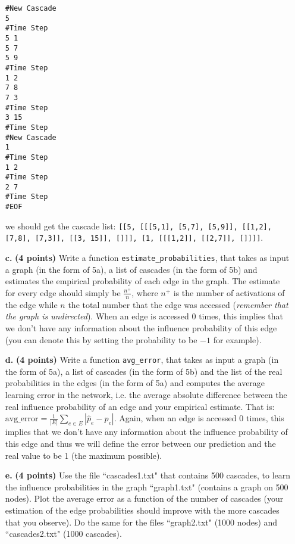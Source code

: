 \documentclass[11pt]{article}
\theoremstyle{definition} \newtheorem{Theorem}{theorem}
\begin{document}
\begin{itemize}
\noindent \texttt{\#New Cascade\\
5\\
\#Time Step\\
5 1\\
5 7\\
5 9\\
\#Time Step\\
1 2\\
7 8\\
7 3\\
\#Time Step\\
3 15\\
\#Time Step\\
\#New Cascade\\
1\\
\#Time Step\\
1 2\\
\#Time Step\\
2 7\\
\#Time Step\\
\#EOF
}

\noindent we should get the cascade list:  \texttt{[[5, [[[5,1], [5,7], [5,9]], [[1,2], [7,8], [7,3]], [[3, 15]], []]], [1, [[[1,2]], [[2,7]], []]]]}.

\item[\textbf{c. }] \textbf{(4 points)} Write a function \texttt{estimate\_probabilities}, that takes as input a graph (in the form of 5a), a list of cascades (in the form of 5b) and estimates the empirical probability of each edge in the graph. The estimate for every edge should simply be $\frac{n^{+}}{n}$, where $n^{+}$ is the number of activations of the edge while $n$ the total number that the edge was accessed (\emph{remember that the graph is undirected}). When an edge is accessed 0 times, this implies that we don't have any information about the influence probability of this edge (you can denote this by setting the probability to be $-1$ for example).

\item[\textbf{d. }] \textbf{(4 points)} Write a function \texttt{avg\_error}, that takes as input a graph (in the form of 5a), a list of cascades (in the form of 5b) and the list of the real probabilities in the edges (in the form of 5a) and computes the average learning error in the network, i.e. the average absolute difference between the real influence probability of an edge and your empirical estimate. That is: $\text{avg\_error} = \frac{1}{|E|}\sum_{e \in E}|\hat{p}_e - p_e|$. Again, when an edge is accessed 0 times, this implies that we don't have any information about the influence probability of this edge and thus we will define the error between our prediction and the real value to be 1 (the maximum possible).

\item[\textbf{e. }] \textbf{(4 points)} Use the file ``cascades1.txt" that contains 500 cascades, to learn the influence probabilities in the graph ``graph1.txt" (contains a graph on 500 nodes). Plot the average error as a function of the number of cascades (your estimation of the edge probabilities should improve with the more cascades that you observe). Do the same for the files ``graph2.txt" (1000 nodes) and ``cascades2.txt" (1000 cascades). 
\end{itemize}
\end{document}
